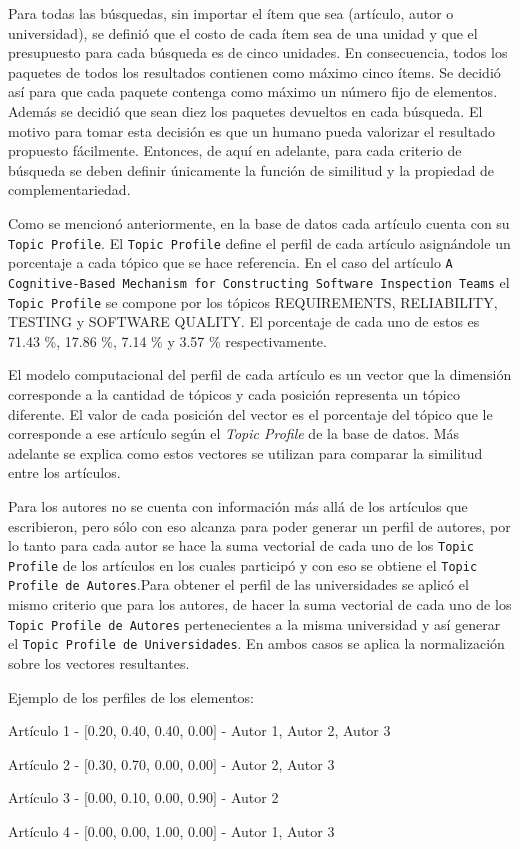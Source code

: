 Para todas las búsquedas, sin importar el ítem que sea (artículo, autor o universidad), se definió que el costo de cada ítem sea de una unidad y que el presupuesto para cada búsqueda es de cinco unidades. En consecuencia, todos los paquetes de todos los resultados contienen como máximo cinco ítems. Se decidió así para que cada paquete contenga como máximo un número fijo de elementos. Además se decidió que sean diez los paquetes devueltos en cada búsqueda. El motivo para tomar esta decisión es que un humano pueda valorizar el resultado propuesto fácilmente. Entonces, de aquí en adelante, para cada criterio de búsqueda se deben definir únicamente la función de similitud y la propiedad de complementariedad.

Como se mencionó anteriormente, en la base de datos cada artículo cuenta con su \texttt{Topic Profile}. El \texttt{Topic Profile} define el perfil de cada artículo asignándole un porcentaje a cada tópico que se hace referencia. En el caso del artículo \texttt{A Cognitive-Based Mechanism for Constructing Software Inspection Teams} el \texttt{Topic Profile} se compone por los tópicos  REQUIREMENTS, RELIABILITY, TESTING y SOFTWARE QUALITY. El porcentaje de cada uno de estos es 71.43 \%, 17.86 \%, 7.14 \% y 3.57 \% respectivamente.

El modelo computacional del perfil de cada artículo es un vector que la dimensión corresponde a la cantidad de tópicos y cada posición representa un tópico diferente. El valor de cada posición del vector es el porcentaje del tópico que le corresponde a ese artículo según el \textit{Topic Profile} de la base de datos. Más adelante se explica como estos vectores se utilizan para comparar la similitud entre los artículos.

Para los autores no se cuenta con información más allá de los artículos que escribieron, pero sólo con eso alcanza para poder generar un perfil de autores, por lo tanto para cada autor se hace la suma vectorial de cada uno de los \texttt{Topic Profile} de los artículos en los cuales participó y con eso se obtiene el \texttt{Topic Profile de Autores}.Para obtener el perfil de las universidades se aplicó el mismo criterio que para los autores, de hacer la suma vectorial de cada uno de los \texttt{Topic Profile de Autores} pertenecientes a la misma universidad y así generar el \texttt{Topic Profile de Universidades}. En ambos casos se aplica la normalización sobre los vectores resultantes.

Ejemplo de los perfiles de los elementos:
\begin{description}
 \item[Artículo - Topic Profile - Autores]
 \item Artículo 1 - $[$0.20, 0.40, 0.40, 0.00$]$ - Autor 1, Autor 2, Autor 3
 \item Artículo 2 - $[$0.30, 0.70, 0.00, 0.00$]$ - Autor 2, Autor 3
 \item Artículo 3 - $[$0.00, 0.10, 0.00, 0.90$]$ - Autor 2
 \item Artículo 4 - $[$0.00, 0.00, 1.00, 0.00$]$ - Autor 1, Autor 3
\end{description}

